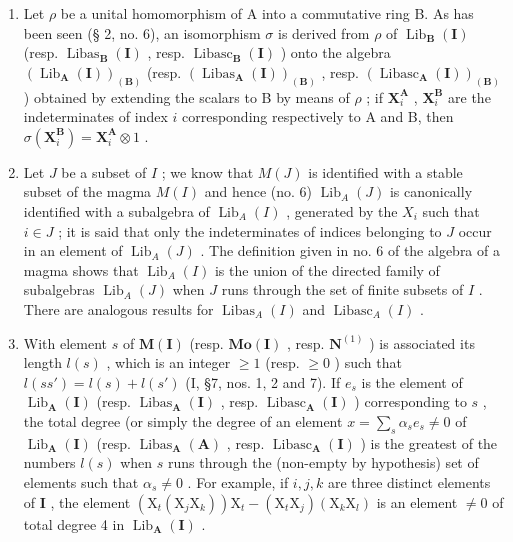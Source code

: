 \begin{enumerate}
\def\labelenumi{(\arabic{enumi})}
\setcounter{enumi}{1}
\item
  Let \(\rho\) be a unital homomorphism of A into a commutative ring B. As has been seen (§ 2, no. 6), an isomorphism \(\sigma\) is derived from \(\rho\) of \(\operatorname{Lib}_{\mathbf{B}}(\mathbf{I})\) (resp. \(\operatorname{Libas}_{\mathbf{B}}(\mathbf{I})\) , resp. \(\operatorname{Libasc}_{\mathbf{B}}(\mathbf{I})\) ) onto the algebra \((\operatorname{Lib}_{\mathbf{A}}(\mathbf{I}))_{(\mathbf{B})}\) (resp. \((\operatorname{Libas}_{\mathbf{A}}(\mathbf{I}))_{(\mathbf{B})}\) , resp. \((\operatorname{Libasc}_{\mathbf{A}}(\mathbf{I}))_{(\mathbf{B})}\) ) obtained by extending the scalars to B by means of \(\rho\) ; if \(\mathbf{X}_i^{\mathbf{A}}\) , \(\mathbf{X}_i^{\mathbf{B}}\) are the indeterminates of index \(i\) corresponding respectively to A and B, then \(\sigma(\mathbf{X}_i^{\mathbf{B}}) = \mathbf{X}_i^{\mathbf{A}} \otimes 1\) .
\item
  Let \(J\) be a subset of \(I\) ; we know that \(M(J)\) is identified with a stable subset of the magma \(M(I)\) and hence (no. 6) \(\operatorname{Lib}_{A}(J)\) is canonically identified with a subalgebra of \(\operatorname{Lib}_{A}(I)\) , generated by the \(X_i\) such that \(i \in J\) ; it is said that only the indeterminates of indices belonging to \(J\) occur in an element of \(\operatorname{Lib}_{A}(J)\) . The definition given in no. 6 of the algebra of a magma shows that \(\operatorname{Lib}_{A}(I)\) is the union of the directed family of subalgebras \(\operatorname{Lib}_{A}(J)\) when \(J\) runs through the set of finite subsets of \(I\) . There are analogous results for \(\operatorname{Libas}_{A}(I)\) and \(\operatorname{Libasc}_{A}(I)\) .
\item
  With element \(s\) of \(\mathbf{M}(\mathbf{I})\) (resp. \(\mathbf{Mo}(\mathbf{I})\) , resp. \(\mathbf{N}^{(1)}\) ) is associated its length \(l(s)\) , which is an integer \(\geqslant 1\) (resp. \(\geqslant 0\) ) such that \(l(ss') = l(s) + l(s')\) (I, §7, nos. 1, 2 and 7). If \(e_s\) is the element of \(\operatorname{Lib}_{\mathbf{A}}(\mathbf{I})\) (resp. \(\operatorname{Libas}_{\mathbf{A}}(\mathbf{I})\) , resp. \(\operatorname{Libasc}_{\mathbf{A}}(\mathbf{I})\) ) corresponding to \(s\) , the total degree (or simply the degree of an element \(x = \sum_{s} \alpha_s e_s \neq 0\) of \(\operatorname{Lib}_{\mathbf{A}}(\mathbf{I})\) (resp. \(\operatorname{Libas}_{\mathbf{A}}(\mathbf{A})\) , resp. \(\operatorname{Libasc}_{\mathbf{A}}(\mathbf{I})\) ) is the greatest of the numbers \(l(s)\) when \(s\) runs through the (non-empty by hypothesis) set of elements such that \(\alpha_s \neq 0\) . For example, if \(i, j, k\) are three distinct elements of \(\mathbf{I}\) , the element \((\mathrm{X}_t(\mathrm{X}_j\mathrm{X}_k))\mathrm{X}_t - (\mathrm{X}_t\mathrm{X}_j)(\mathrm{X}_k\mathrm{X}_l)\) is an element \(\neq 0\) of total degree 4 in \(\operatorname{Lib}_{\mathbf{A}}(\mathbf{I})\) .
\end{enumerate}

